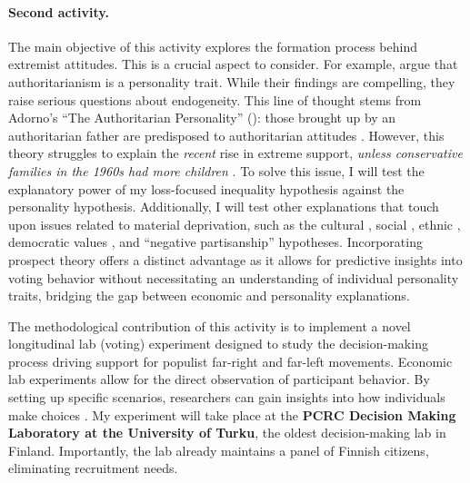 \documentclass[letterpaper]{article}
\begin{document}
\vspace{-3mm}\paragraph{Second activity.} The main objective of this activity explores the formation process behind extremist attitudes. This is a crucial aspect to consider. For example, \textcite[p. 1]{Cohen2016} argue that authoritarianism is a personality trait. While their findings are compelling, they raise serious questions about endogeneity. This line of thought stems from Adorno's ``The Authoritarian Personality'' (\citeyear{Adorno1950}): those brought up by an authoritarian father are predisposed to authoritarian attitudes \parencite{Helminen2023}. However, this theory struggles to explain the \emph{recent} rise in extreme support, \emph{unless conservative families in the 1960s had more children} \parencite[p. 218]{Mudde2007b}. To solve this issue, I will test the explanatory power of my loss-focused inequality hypothesis against the personality hypothesis. Additionally, I will test other explanations that touch upon issues related to material deprivation, such as the cultural \parencite{Engler2021,Veugelers2002}, social \parencite{Gidron2017a}, ethnic \parencite{Helske2023}, democratic values \parencite{Lipset1981,Carlin2015}, and ``negative partisanship'' \parencite{Mudde2018} hypotheses. Incorporating prospect theory offers a distinct advantage as it allows for predictive insights into voting behavior without necessitating an understanding of individual personality traits, bridging the gap between economic and personality explanations.

\vspace{2mm}The methodological contribution of this activity is to implement a novel longitudinal lab (voting) experiment designed to study the decision-making process driving support for populist far-right and far-left movements. Economic lab experiments allow for the direct observation of participant behavior. By setting up specific scenarios, researchers can gain insights into how individuals make choices \parencite{Kahneman:2012tc}. My experiment will take place at the {\bf PCRC Decision Making Laboratory at the University of Turku}, the oldest decision-making lab in Finland.  Importantly, the lab already maintains a panel of Finnish citizens, eliminating recruitment needs. 
\end{document}
